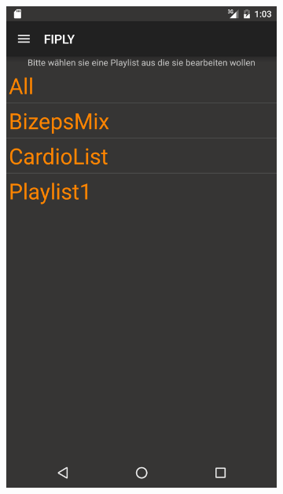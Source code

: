 \documentclass[FIPLY_base.tex]{subfiles}
\begin{document}
\begin{figure}[H]
	\begin{subfigure}[b]{0.3\textwidth}
	\includegraphics[scale=0.13]{img/musicPlaylistView1}
	\end{subfigure}
	\hfil
	\begin{subfigure}[b]{0.3\textwidth}

\end{subfigure}
\end{figure}
\end{document}
